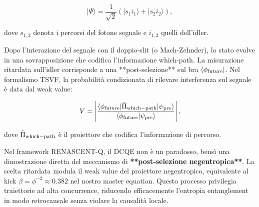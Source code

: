 \documentclass[11pt,a4paper]{article}
\theoremstyle{plain}
\theoremstyle{definition}
\begin{document}
\vspace{0.4cm}

\begin{tcolorbox}[
  colback=blue!3!white, 
  colframe=blue!80!black, 
  title=Stato entangled iniziale nel DCQE, 
  fonttitle=\bfseries,
  breakable,
  enhanced,
  width=\textwidth,
  boxrule=0.9pt,
  arc=6pt
]
\begin{equation}
|\Psi\rangle = \frac{1}{\sqrt{2}} \left( |s_1 i_1\rangle + |s_2 i_2\rangle \right),
\label{eq:dcqe_entangled}
\end{equation}
\end{tcolorbox}

\vspace{0.3cm}

dove $s_{1,2}$ denota i percorsi del fotone segnale e $i_{1,2}$ quelli dell'idler. 

\vspace{0.4cm}

Dopo l'interazione del segnale con il doppio-slit (o Mach-Zehnder), lo stato evolve in una sovrapposizione che codifica l'informazione which-path. La misurazione ritardata sull'idler corrisponde a una **post-selezione** sul bra $\langle \phi_{\rm future}|$. Nel formalismo TSVF, la probabilità condizionata di rilevare interferenza sul segnale è data dal weak value:

\vspace{0.3cm}

\begin{tcolorbox}[
  colback=cyan!5!white, 
  colframe=cyan!70!black, 
  title=Visibilità interferenza condizionata via weak value, 
  fonttitle=\bfseries,
  breakable,
  enhanced,
  width=\textwidth,
  boxrule=0.9pt,
  arc=6pt
]
\begin{equation}
V = \left| \frac{\langle \phi_{\rm future} | \hat{\Pi}_{\rm which-path} | \psi_{\rm pre} \rangle}{\langle \phi_{\rm future} | \psi_{\rm pre} \rangle} \right|,
\label{eq:dcqe_visibility}
\end{equation}
\end{tcolorbox}

\vspace{0.3cm}

dove $\hat{\Pi}_{\rm which-path}$ è il proiettore che codifica l'informazione di percorso.



\vspace{0.4cm}

Nel framework RENASCENT-Q, il DCQE non è un paradosso, bensì una dimostrazione diretta del meccanismo di \textbf{**post-selezione negentropica**}. La scelta ritardata modula il weak value del proiettore negentropico, equivalente al kick $\beta = \phi^{-2} \approx 0.382$ nel nostro master equation. Questo processo privilegia traiettorie ad alta concurrence, riducendo efficacemente l'entropia entanglement in modo retrocausale senza violare la causalità locale.
\end{document}
